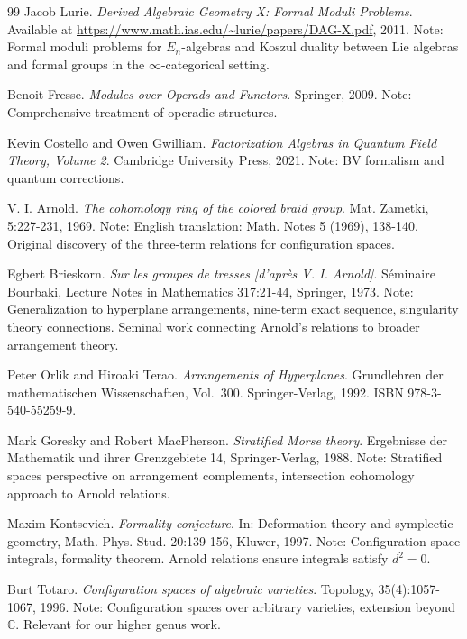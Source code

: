 \begin{thebibliography}{99}
Jacob Lurie.
\textit{Derived Algebraic Geometry X: Formal Moduli Problems}.
Available at \url{https://www.math.ias.edu/~lurie/papers/DAG-X.pdf}, 2011.
Note: Formal moduli problems for $E_n$-algebras and Koszul duality
between Lie algebras and formal groups in the $\infty$-categorical setting.


Benoit Fresse.
\textit{Modules over Operads and Functors}.
Springer, 2009.
Note: Comprehensive treatment of operadic structures.

Kevin Costello and Owen Gwilliam.
\textit{Factorization Algebras in Quantum Field Theory, Volume 2}.
Cambridge University Press, 2021.
Note: BV formalism and quantum corrections.


V. I. Arnold.
\textit{The cohomology ring of the colored braid group}.
Mat. Zametki, 5:227-231, 1969.
Note: English translation: Math. Notes 5 (1969), 138-140. 
Original discovery of the three-term relations for configuration spaces.

Egbert Brieskorn.
\textit{Sur les groupes de tresses [d'après V. I. Arnold]}.
Séminaire Bourbaki, Lecture Notes in Mathematics 317:21-44, Springer, 1973.
Note: Generalization to hyperplane arrangements, nine-term exact sequence, 
singularity theory connections. Seminal work connecting Arnold's relations 
to broader arrangement theory.

Peter Orlik and Hiroaki Terao.
\newblock \textit{Arrangements of Hyperplanes}.
\newblock Grundlehren der mathematischen Wissenschaften, Vol.~300.
\newblock Springer-Verlag, 1992.
\newblock ISBN 978-3-540-55259-9.

Mark Goresky and Robert MacPherson.
\textit{Stratified Morse theory}.
Ergebnisse der Mathematik und ihrer Grenzgebiete 14, Springer-Verlag, 1988.
Note: Stratified spaces perspective on arrangement complements, 
intersection cohomology approach to Arnold relations.

Maxim Kontsevich.
\textit{Formality conjecture}.
In: Deformation theory and symplectic geometry, Math. Phys. Stud. 20:139-156, Kluwer, 1997.
Note: Configuration space integrals, formality theorem. 
Arnold relations ensure integrals satisfy $d^2 = 0$.

Burt Totaro.
\textit{Configuration spaces of algebraic varieties}.
Topology, 35(4):1057-1067, 1996.
Note: Configuration spaces over arbitrary varieties, 
extension beyond $\mathbb{C}$. Relevant for our higher genus work.




\end{thebibliography}
